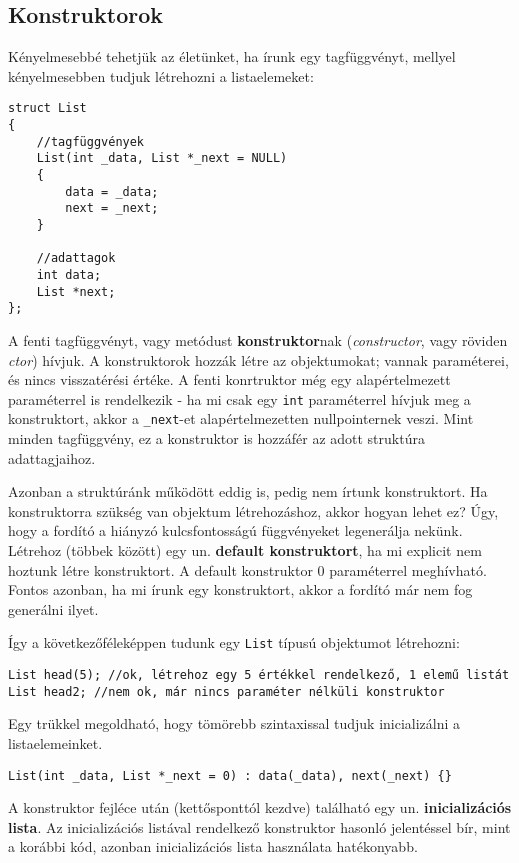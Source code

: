\documentclass[a4paper,11.5pt,table]{article}
\begin{document}
	\subsection{Konstruktorok}
	Kényelmesebbé tehetjük az életünket, ha írunk egy tagfüggvényt, mellyel kényelmesebben tudjuk létrehozni a listaelemeket:
	\begin{lstlisting}
struct List
{
	//tagfüggvények
	List(int _data, List *_next = NULL)
	{
		data = _data;
		next = _next;
	}
	
	//adattagok
	int data;
	List *next;
};
	\end{lstlisting}
	A fenti tagfüggvényt, vagy metódust \textbf{konstruktor}nak (\textit{constructor}, vagy röviden \textit{ctor}) hívjuk. A konstruktorok hozzák létre az objektumokat; vannak paraméterei, és nincs visszatérési értéke. A fenti konrtruktor még egy alapértelmezett paraméterrel is rendelkezik - ha mi csak egy \texttt{int} paraméterrel hívjuk meg a konstruktort, akkor a \texttt{\_next}-et alapértelmezetten nullpointernek veszi. Mint minden tagfüggvény, ez a konstruktor is hozzáfér az adott struktúra adattagjaihoz.
	
	\medskip
	Azonban a struktúránk működött eddig is, pedig nem írtunk konstruktort. Ha konstruktorra szükség van objektum létrehozáshoz, akkor hogyan lehet ez? Úgy, hogy a fordító a hiányzó kulcsfontosságú függvényeket legenerálja nekünk. Létrehoz (többek között) egy un. \textbf{default konstruktort}, ha mi explicit nem hoztunk létre konstruktort. A default konstruktor 0 paraméterrel meghívható. Fontos azonban, ha mi írunk egy konstruktort, akkor a fordító már nem fog generálni ilyet.
	
	\medskip
	Így a következőféleképpen tudunk egy \texttt{List} típusú objektumot létrehozni:
	\begin{lstlisting}
List head(5); //ok, létrehoz egy 5 értékkel rendelkező, 1 elemű listát
List head2; //nem ok, már nincs paraméter nélküli konstruktor
	\end{lstlisting}
	Egy trükkel megoldható, hogy tömörebb szintaxissal tudjuk inicializálni a listaelemeinket.
	\begin{lstlisting}
List(int _data, List *_next = 0) : data(_data), next(_next) {}
	\end{lstlisting}
	
	\medskip
	A konstruktor fejléce után (kettősponttól kezdve) található egy un. \textbf{inicializációs lista}. Az inicializációs listával rendelkező konstruktor hasonló jelentéssel bír, mint a korábbi kód, azonban inicializációs lista használata hatékonyabb.
	
\end{document}
